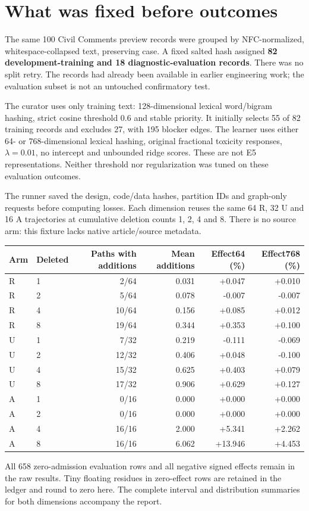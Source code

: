 \documentclass[11pt,a4paper]{article}
\begin{document}
\section*{What was fixed before outcomes}
The same 100 Civil Comments preview records were grouped by NFC-normalized,
whitespace-collapsed text, preserving case. A fixed salted hash assigned
\textbf{82 development-training and 18 diagnostic-evaluation records}.
There was no split retry. The records had already been available in earlier
engineering work; the evaluation subset is not an untouched confirmatory test.

The curator uses only training text: 128-dimensional lexical word/bigram
hashing, strict cosine threshold 0.6 and stable priority. It initially selects
55 of 82 training records and excludes 27, with 195 blocker edges. The learner
uses either 64- or 768-dimensional lexical hashing, original fractional
toxicity responses, $\lambda=0.01$, no intercept and unbounded ridge scores.
These are not E5 representations. Neither threshold nor regularization was
tuned on these evaluation outcomes.

The runner saved the design, code/data hashes, partition IDs and graph-only
requests before computing losses. Each dimension reuses the same 64 R,
32 U and 16 A trajectories at cumulative deletion counts 1, 2, 4 and 8.
There is no source arm: this fixture lacks native article/source metadata.

\begin{center}\small
\begin{tabular}{llrrrr}\toprule
Arm & Deleted & Paths with additions & Mean additions & Effect64 (\%) & Effect768 (\%)\\\midrule
R & 1 & 2/64 & 0.031 & +0.047 & +0.010 \\
R & 2 & 5/64 & 0.078 & -0.007 & -0.007 \\
R & 4 & 10/64 & 0.156 & +0.085 & +0.012 \\
R & 8 & 19/64 & 0.344 & +0.353 & +0.100 \\
U & 1 & 7/32 & 0.219 & -0.111 & -0.069 \\
U & 2 & 12/32 & 0.406 & +0.048 & -0.100 \\
U & 4 & 15/32 & 0.625 & +0.403 & +0.079 \\
U & 8 & 17/32 & 0.906 & +0.629 & +0.127 \\
A & 1 & 0/16 & 0.000 & +0.000 & +0.000 \\
A & 2 & 0/16 & 0.000 & +0.000 & +0.000 \\
A & 4 & 16/16 & 2.000 & +5.341 & +2.262 \\
A & 8 & 16/16 & 6.062 & +13.946 & +4.453 \\
\bottomrule\end{tabular}\end{center}
All 658 zero-admission evaluation rows and all negative signed effects remain
in the raw results. Tiny floating residues in zero-effect rows are retained
in the ledger and round to zero here. The complete interval and distribution
summaries for both dimensions accompany the report.
\end{document}
